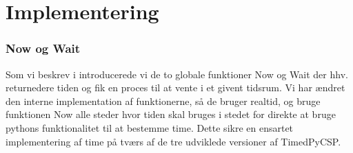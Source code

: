 \section{Implementering}

\subsubsection{Now og Wait}
Som vi beskrev i \des introducerede vi de to globale funktioner Now og Wait der hhv. returnedere tiden og fik en proces til at vente i et givent tidsrum. Vi har ændret den interne implementation af funktionerne, så de bruger realtid, og bruge funktionen Now alle steder hvor tiden skal bruges i stedet  for direkte at bruge pythons funktionalitet til at bestemme time. Dette sikre en ensartet implementering af time på tværs af de tre udviklede versioner af TimedPyCSP.


